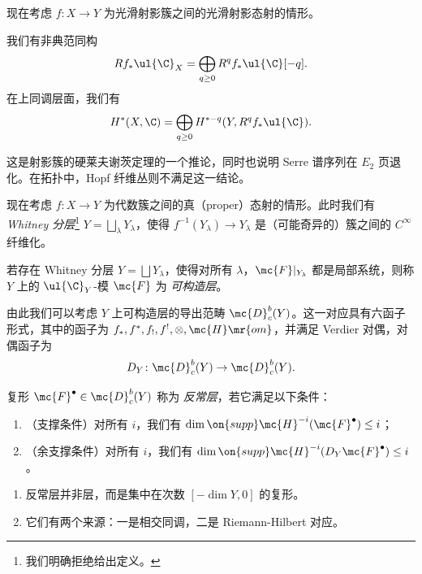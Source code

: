 现在考虑 \(f \colon X \to Y\) 为光滑射影簇之间的光滑射影态射的情形。

\begin{thm}
    我们有非典范同构
    \[ R f_* \ul{\C}_X = \bigoplus_{q \geq 0} R^q f_* \ul{\C}[-q]. \]
    在上同调层面，我们有
    \[ H^*(X, \C) = \bigoplus_{q \geq 0} H^{*-q}(Y, R^q f_* \ul{\C}). \]
\end{thm}

这是射影簇的硬莱夫谢茨定理的一个推论，同时也说明 Serre 谱序列在 \(E_2\) 页退化。在拓扑中，Hopf 纤维丛则不满足这一结论。

现在考虑 \(f \colon X \to Y\) 为代数簇之间的真（proper）态射的情形。此时我们有 \textit{Whitney 分层}\footnote{我们明确拒绝给出定义。} \(Y = \bigsqcup_{\lambda} Y_{\lambda}\)，使得 \(f^{-1}(Y_{\lambda}) \to Y_{\lambda}\) 是（可能奇异的）簇之间的 \(C^{\infty}\) 纤维化。

\begin{defn}
    若存在 Whitney 分层 \(Y = \bigsqcup Y_{\lambda}\)，使得对所有 \(\lambda\)，\(\mc{F}|_{Y_{\lambda}}\) 都是局部系统，则称 \(Y\) 上的 \(\ul{\C}_Y\)-模 \(\mc{F}\) 为 \textit{可构造层}。
\end{defn}

由此我们可以考虑 \(Y\) 上可构造层的导出范畴 \(\mc{D}_c^b(Y)\)。这一对应具有六函子形式，其中的函子为 \(f_*, f^*, f_!, f^!, \otimes, \mc{H}\mr{om}\)，并满足 Verdier 对偶，对偶函子为
\[ D_Y \colon \mc{D}_c^b(Y) \to \mc{D}_c^b(Y). \]

\begin{defn}
    复形 \(\mc{F}^{\bullet} \in \mc{D}_c^b(Y)\) 称为 \textit{反常层}，若它满足以下条件：
    \begin{enumerate}
        \item （支撑条件）对所有 \(i\)，我们有 \(\dim \on{supp} \mc{H}^{-i}(\mc{F}^{\bullet}) \leq i\)；
        \item （余支撑条件）对所有 \(i\)，我们有 \(\dim \on{supp} \mc{H}^{-i}(D_Y \mc{F}^{\bullet}) \leq i\)。
    \end{enumerate}
\end{defn}

\begin{rmks}\leavevmode
    \begin{enumerate}
        \item 反常层并非层，而是集中在次数 \([-\dim Y, 0]\) 的复形。
        \item 它们有两个来源：一是相交同调，二是 Riemann-Hilbert 对应。
    \end{enumerate}
\end{rmks}

